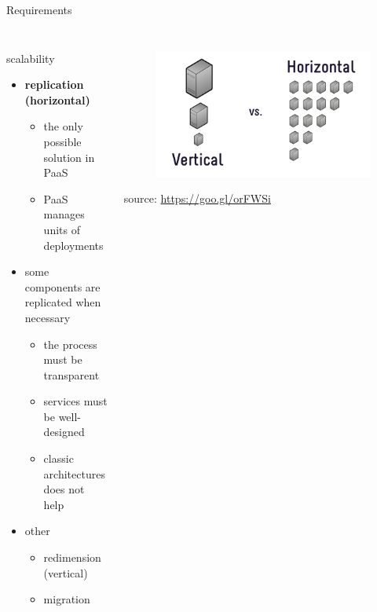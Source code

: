 \begin{frame}{Requirements}
{\begin{columns}
\begin{column}{0.4\textwidth}
\begin{figure}
				\end{figure}
			\end{column}
		\end{columns}
	}
	{
		\begin{columns}
			\begin{column}{0.65\textwidth}
				scalability
				\begin{itemize}
					\item{\footnotesize{\textbf{replication (horizontal)}}}
					\begin{itemize}
						\item{\scriptsize{the only possible solution in PaaS}}
						\item{\scriptsize{PaaS manages units of deployments}}
					\end{itemize}
					\item{\footnotesize{some components are replicated when necessary}}
					\begin{itemize}
						\item{\scriptsize{the process must be transparent}}
						\item{\scriptsize{services must be well-designed}}
						\item{\scriptsize{classic architectures does not help}}
					\end{itemize}
					\item{\footnotesize{other}}
					\begin{itemize}
						\item{\scriptsize{redimension (vertical)}}
						\item{\scriptsize{migration}}
					\end{itemize}
				\end{itemize}
			\end{column}
			\begin{column}{0.35\textwidth}
				\begin{figure}
					\centering{}
					\includegraphics[scale=0.15]{images/scalability.png}
				\end{figure}
				\begin{flushright}
					\tiny{source: \url{https://goo.gl/orFWSi}}
				\end{flushright}
			\end{column}
		\end{columns}
	}
\end{frame}

